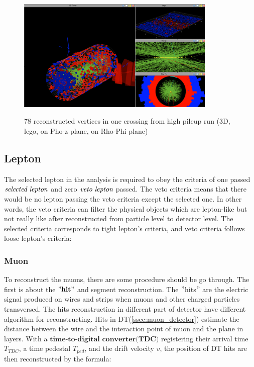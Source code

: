 		\begin{figure}[H]
		\centering{}
	    	\includegraphics[width=0.85\textwidth]{Figures/PhysObj/pileup_image.png}\\
		\caption{78 reconstructed vertices in one crossing from high pileup run (3D, lego, on Pho-z plane, on Rho-Phi plane) \cite{Pileup_page}}
		\label{PhysObj:fig:pileup_img}
		\end{figure}
		\FloatBarrier



	\subsection{Lepton}
	\label{ssec:PhysObj_lep}

		The selected lepton in the analysis is required to obey the criteria of one passed $\emph{selected lepton}$ and zero $\emph{veto lepton}$ passed. The veto criteria means that there would be no lepton passing the veto criteria except the selected one. In other words, the veto criteria can filter the physical objects which are lepton-like but not really like after reconstructed from particle level to detector level. The selected criteria corresponds to tight lepton's criteria, and veto criteria follows loose lepton's criteria:

		\subsubsection{Muon}
		\label{sssec:PhysObj_MuonReco}

			To reconstruct the muons, there are some procedure should be go through. The first is about the $"\textbf{hit}"$ and segment reconstruction. The $"$hits$"$ are the electric signal produced on wires and strips when muons and other charged particles transversed. The hits reconstruction in different part of detector have different algorithm for reconstructing. Hits in DT(\ref{ssec:muon_detector}) estimate the distance between the wire and the interaction point of muon and the plane in layers. With a $\textbf{time-to-digital}$ $\textbf{converter}$$\textbf{(TDC)}$ registering their arrival time $T_{TDC}$, a time pedestal $T_{ped}$, and the drift velocity $v$, the position of DT hits are then reconstructed by the formula:

